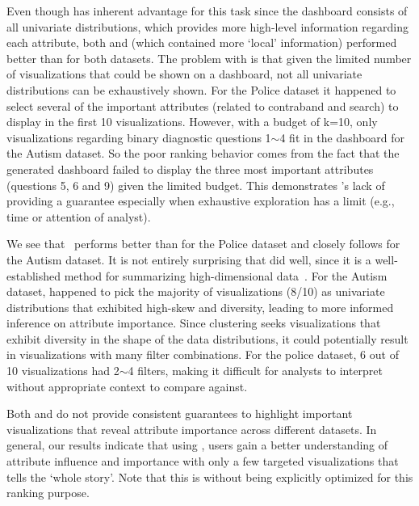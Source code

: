 \par Even though \BFS has inherent advantage for this task since the dashboard consists of all univariate distributions, which provides more high-level information regarding each attribute, both \system and \cluster (which contained more `local' information) performed better than \BFS for both datasets. The problem with \BFS is that given the limited number of visualizations that could be shown on a dashboard, not all univariate distributions can be exhaustively shown. For the Police dataset it happened to select several of the important attributes (related to contraband and search) to display in the first 10 visualizations. However, with a budget of k=10, only visualizations regarding binary diagnostic questions 1$\sim$4 fit in the dashboard for the Autism dataset. So the poor ranking behavior comes from the fact that the \BFS generated dashboard failed to display the three most important attributes (questions 5, 6 and 9) given the limited budget. This demonstrates \BFS's lack of providing a guarantee especially when exhaustive exploration has a limit (e.g., time or attention of analyst). 
\par We see that \system\ performs better than \cluster for the Police dataset and closely follows \cluster for the Autism dataset. It is not entirely surprising that \cluster did well, since it is a well-established method for summarizing high-dimensional data~\cite{Han2005}. For the Autism dataset, \cluster happened to pick the majority of visualizations (8/10) as univariate distributions that exhibited high-skew and diversity, leading to more informed inference on attribute importance. Since clustering seeks visualizations that exhibit diversity in the shape of the data distributions, it could potentially result in visualizations with many filter combinations. For the police dataset, 6 out of 10 visualizations had 2$\sim$4 filters, making it difficult for analysts to interpret without appropriate context to compare against. 
\par Both \BFS and \cluster do not provide consistent guarantees to highlight important visualizations that reveal attribute importance across different datasets. In general, our results indicate that using \system, users gain a better understanding of attribute influence and importance with only a few targeted visualizations that tells the `whole story'. Note that this is without \system being explicitly optimized for this ranking purpose.

